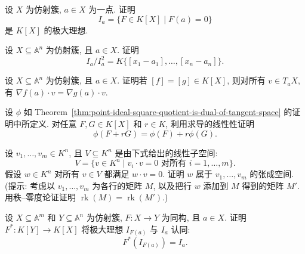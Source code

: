 \BookExerciseHeading
\begin{BookExercises}
  \item\label{ex:point-ideal-is-maximal-in-coordinate-ring} 设 $X$ 为仿射簇, $a\in X$ 为一点. 证明
  \[
    I_{a}=\{F\in K[X]\mid F(a)=0\}
  \]
  是 $K[X]$ 的极大理想.
  \item\label{ex:point-ideal-quotient-spanned-by-coordinate-linear-functions} 设 $X\subseteq\mathbb{A}^{n}$ 为仿射簇, 且 $a\in X$. 证明
  \[
    I_{a}/I_{a}^{2}=K\{[x_{1}-a_{1}],\ldots,[x_{n}-a_{n}]\}.
  \]
  \item\label{ex:tangent-functional-independent-of-representative} 设 $X\subseteq\mathbb{A}^{n}$ 为仿射簇, 且 $a\in X$. 证明若 $[f]=[g]\in K[X]$, 则对所有 $v\in T_{a}X$, 有 $\nabla f(a)\cdot v=\nabla g(a)\cdot v$.
  \item\label{ex:map-from-point-ideal-to-tangent-dual-is-linear} 设 $\phi$ 如 Theorem~\ref{thm:point-ideal-square-quotient-is-dual-of-tangent-space} 的证明中所定义. 对任意 $F,G\in K[X]$ 和 $r\in K$, 利用求导的线性性证明
  \[
    \phi(F+rG)=\phi(F)+r\phi(G).
  \]
  \item\label{ex:annihilator-of-kernel-is-row-span} 设 $v_{1},\ldots,v_{m}\in K^{n}$, 且 $V\subseteq K^{n}$ 是由下式给出的线性子空间:
  \[
    V=\{v\in K^{n}\mid v_{i}\cdot v=0\text{ 对所有 }i=1,\ldots,m\}.
  \]
  假设 $w\in K^{n}$ 对所有 $v\in V$ 都满足 $w\cdot v=0$. 证明 $w$ 属于 $v_{1},\ldots,v_{m}$ 的张成空间. (提示: 考虑以 $v_{1},\ldots,v_{m}$ 为各行的矩阵 $M$, 以及把行 $w$ 添加到 $M$ 得到的矩阵 $M'$. 用秩--零度论证证明 $\operatorname{rk}(M)=\operatorname{rk}(M')$.)
  \item\label{ex:pullback-identifies-maximal-point-ideals} 设 $X\subseteq\mathbb{A}^{m}$ 和 $Y\subseteq\mathbb{A}^{n}$ 为仿射簇, $F:X\to Y$ 为同构, 且 $a\in X$. 证明 $F^{*}:K[Y]\to K[X]$ 将极大理想 $I_{F(a)}$ 与 $I_{a}$ 认同:
  \[
    F^{*}(I_{F(a)})=I_{a}.
  \]
\end{BookExercises}
